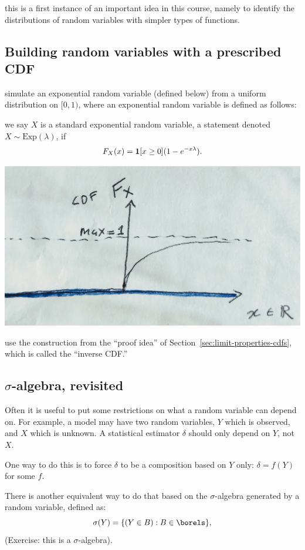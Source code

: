 \documentclass{article}
\begin{document}
 this is a first instance of an important idea in this course, namely to identify the distributions of random variables with simpler types of functions.


\subsection{Building random variables with a prescribed CDF}\label{sec:inverse-cdf}

 simulate an exponential random variable (defined below) from a uniform distribution on $[0, 1)$, where an exponential random variable is defined as follows:

 we say $X$ is a standard exponential random variable, a statement denoted $X \sim \text{Exp}(\lambda)$, if \[F_X(x) = {\mathbf 1}[x \ge 0] (1 - e^{-x \lambda}). \]
\begin{center}
	\includegraphics[width=0.4\linewidth]{figures/cdf-exp}
\end{center}

 use the construction from the ``proof idea'' of Section~\ref{sec:limit-properties-cdfs}, which is called the ``inverse CDF.''


\subsection{$\sigma$-algebra, revisited}\label{sec:sigma-alg-and-estimator}

Often it is useful to put some restrictions on what a random variable can depend on. For example, a model may have two random variables, $Y$ which is observed, and $X$ which is unknown. A statistical estimator $\delta$ should only depend on $Y$, not $X$. 

 One way to do this is to force $\delta$ to be a composition based on $Y$ only: $\delta = f(Y)$ for some $f$. 

 There is another equivalent way to do that based on the $\sigma$-algebra generated by a random variable, defined as:
\[ \sigma(Y) = \{ (Y \in B) : B \in \borels\}, \]
(Exercise: this is a $\sigma$-algebra). 
\end{document}
